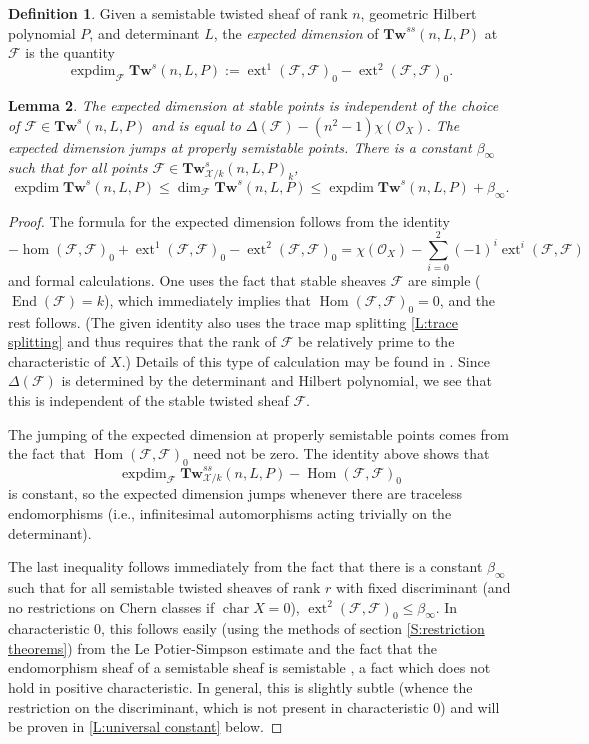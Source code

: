 \documentclass[11pt]{amsart}
\newcommand{\ms}[1]{\mathscr #1}
\renewcommand{\hom}{\operatorname{Hom}}
\DeclareMathOperator{\dimhom}{hom}
\DeclareMathOperator{\dimext}{ext}
\newcommand{\ch}{\operatorname{char}}
\renewcommand{\[}{[\!\hspace{0.03em}[}
\renewcommand{\]}{]\!\hspace{0.03em}]}
\renewcommand{\(}{(\!\hspace{0.03em}(}
\renewcommand{\)}{)\!\hspace{0.03em})}
\DeclareMathOperator{\End}{\operatorname{End}}
\newcommand{\Tw}{\mathbf{Tw}}
\DeclareMathOperator{\expdim}{exp dim}
\newtheorem{lem}{Lemma}[subsubsection]%
\theoremstyle{definition}
\newtheorem{defn}[lem]{Definition}
\theoremstyle{remark}
\begin{document}
\begin{defn} Given a semistable twisted sheaf of rank $n$, 
geometric Hilbert polynomial $P$, and determinant $L$, the 
\emph{expected dimension\/} of $\Tw^{ss}(n,L,P)$ at $\ms F$ 
is the quantity 
$$\expdim_{\ms F}\Tw^{s}(n,L,P):=\dimext^{1}(\ms F,\ms F)_{0}-\dimext^{2}(\ms F,\ms F)_{0}.$$
\end{defn}
\begin{lem}\label{L:dimension estimate} The expected dimension at stable 
points is independent of the choice of $\ms 
F\in\Tw^{s}(n,L,P)$ and is equal to $\Delta(\ms 
F)-(n^{2}-1)\chi({\ms O}_{X})$.  The expected dimension jumps at properly 
semistable points.  There is a constant $\beta_{\infty}$ such that 
for all points $\ms F\in\Tw^{s}_{\ms X/k}(n,L,P)_{k}$, 
$$\expdim\Tw^{s}(n,L,P)\leq\dim_{\ms 
F}\Tw^{s}(n,L,P)\leq\expdim\Tw^{s}(n,L,P)+\beta_{\infty}.$$
\end{lem}
\begin{proof} The formula for the expected dimension follows from the identity
$$-\dimhom(\ms F,\ms F)_{0}+\dimext^{1}(\ms F,\ms F)_{0}-\dimext^{2}(\ms F,\ms 
F)_{0}=\chi({\ms O}_{X})-\sum_{i=0}^{2}(-1)^{i}\dimext^{i}(\ms F,\ms F)$$
and formal calculations.  One uses the fact that stable sheaves $\ms 
F$ are simple ($\End(\ms F)=k$), which immediately implies that $\hom(\ms 
F,\ms F)_{0}=0$, and the rest follows.  (The given identity also uses the trace map 
splitting \ref{L:trace splitting} and thus requires that the rank of $\ms F$ be 
relatively prime to the characteristic of $X$.)
Details of this type of calculation may be found in \cite[4.5, 6.1, 
8.3]{h-l}.  Since $\Delta(\ms F)$ is determined by the determinant and 
Hilbert polynomial, we see that this 
is independent of the stable twisted sheaf $\ms F$.

The jumping of the expected dimension at properly semistable points 
comes from the fact that $\hom(\ms F,\ms F)_{0}$ need not be zero.  
The identity above shows that $$\expdim_{\ms F}\Tw^{ss}_{\ms 
X/k}(n,L,P)-\hom(\ms F,\ms F)_{0}$$ is constant, so the expected 
dimension jumps whenever there are traceless endomorphisms (i.e., 
infinitesimal automorphisms acting trivially on the determinant).

The last inequality follows immediately from the fact that there is a constant 
$\beta_{\infty}$ such that for all semistable twisted sheaves of 
rank $r$ with fixed discriminant (and no restrictions on Chern 
classes if $\ch X=0$), $\dimext^{2}(\ms F,\ms F)_{0}\leq\beta_{\infty}$.
In characteristic 0, this follows easily (using the methods of 
section \ref{S:restriction theorems}) from the Le 
Potier-Simpson estimate and the fact that the endomorphism sheaf of a 
semistable sheaf is semistable \cite[4.5.7]{h-l}, a fact which does not 
hold in positive characteristic.  In general, this is slightly 
subtle (whence the restriction on the discriminant, which is not 
present in characteristic 0) and will be 
proven in \ref{L:universal constant} below.
\end{proof}
\end{document}
